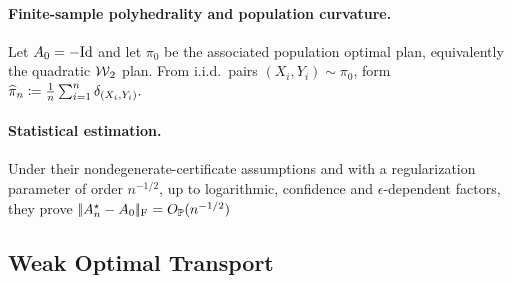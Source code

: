\paragraph{Finite-sample polyhedrality and population curvature.}
Let $A_0=-\mathrm{Id}$ and let $\pi_0$ be the associated population optimal plan, equivalently the quadratic $\operatorname{\mathcal{W}}_2$ plan. From i.i.d.\ pairs $(X_i,Y_i)\sim\pi_0$, form
\(\widehat\pi_n\coloneqq\frac1n\sum_{i=1}^n\delta_{(X_i,Y_i)}.\)
\paragraph{Statistical estimation.}
Under their nondegenerate-certificate assumptions and with a regularization parameter of order $n^{-1/2}$, up to logarithmic, confidence and $\epsilon$-dependent factors, they prove
\(|\!| A_n^\star-A_0 |\!|_{\mathrm F}=O_{\mathbb{P}}(n^{-1/2})\)
\subsection{Weak Optimal Transport}
\label{sec-weak-ot}
